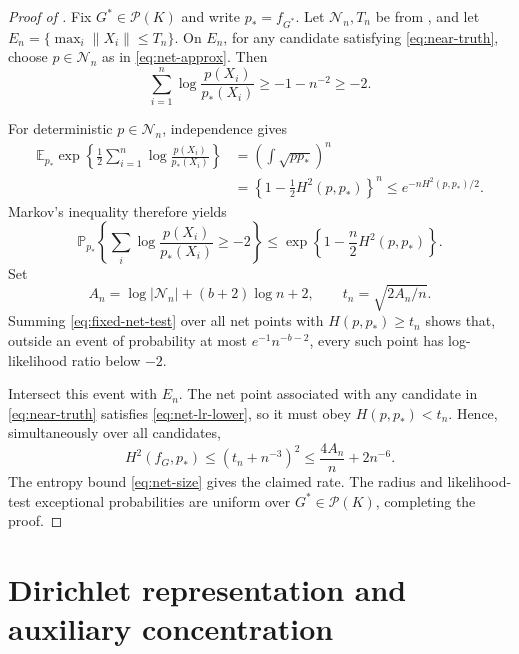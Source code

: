 \documentclass[11pt]{article}
\theoremstyle{definition}
\theoremstyle{remark}
\newcommand{\Pcal}{\mathcal P}
\newcommand{\Ncal}{\mathcal N}
\newcommand{\EE}{\mathbb E}
\newcommand{\PP}{\mathbb P}
\newcommand{\norm}[1]{\lVert #1\rVert}
\newcommand{\abs}[1]{\lvert #1\rvert}
\begin{document}
\begin{proof}[Proof of ]
Fix $G^*\in\Pcal(K)$ and write $p_*=f_{G^*}$.  Let $\Ncal_n,T_n$ be from
, and let
$E_n=\{\max_i\norm{X_i}\le T_n\}$.  On $E_n$, for any candidate satisfying
\eqref{eq:near-truth}, choose $p\in\Ncal_n$ as in
\eqref{eq:net-approx}.  Then
\begin{equation}\label{eq:net-lr-lower}
 \sum_{i=1}^n\log\frac{p(X_i)}{p_*(X_i)}
 \ge-1-n^{-2}\ge-2.
\end{equation}

For deterministic $p\in\Ncal_n$, independence gives
\begin{align*}
 \EE_{p_*}\exp\left\{\frac12\sum_{i=1}^n
       \log\frac{p(X_i)}{p_*(X_i)}\right\}
 &=\left(\int\sqrt{pp_*}\right)^n\\
 &=\left\{1-\frac12H^2(p,p_*)\right\}^n
 \le e^{-nH^2(p,p_*)/2}.
\end{align*}
Markov's inequality therefore yields
\begin{equation}\label{eq:fixed-net-test}
 \PP_{p_*}\left\{\sum_i\log\frac{p(X_i)}{p_*(X_i)}\ge-2\right\}
 \le\exp\left\{1-\frac n2H^2(p,p_*)\right\}.
\end{equation}
Set
\[
 A_n=\log\abs{\Ncal_n}+(b+2)\log n+2,
 \qquad t_n=\sqrt{2A_n/n}.
\]
Summing \eqref{eq:fixed-net-test} over all net points with
$H(p,p_*)\ge t_n$ shows that, outside an event of probability at most
$e^{-1}n^{-b-2}$, every such point has log-likelihood ratio below $-2$.

Intersect this event with $E_n$.  The net point associated with any candidate
in \eqref{eq:near-truth} satisfies \eqref{eq:net-lr-lower}, so it must obey
$H(p,p_*)<t_n$.  Hence, simultaneously over all candidates,
\[
 H^2(f_G,p_*)\le(t_n+n^{-3})^2
 \le\frac{4A_n}{n}+2n^{-6}.
\]
The entropy bound \eqref{eq:net-size} gives the claimed rate.  The radius and
likelihood-test exceptional probabilities are uniform over
$G^*\in\Pcal(K)$, completing the proof.
\end{proof}

\section{Dirichlet representation and auxiliary concentration}
\label{app:dirichlet}
\end{document}
